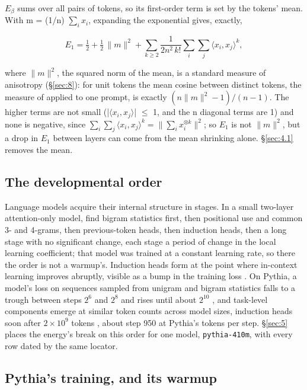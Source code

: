\documentclass[11pt]{article}
\begin{document}
$E_\beta $ sums over all pairs of tokens, so its first-order term is set by the tokens' mean. With m = (1/n) $\sum _{i} x_{i}$, expanding the exponential gives, exactly,

\begin{equation}
E_1 = \tfrac12 + \tfrac12\,\|m\|^2 + \sum_{k\ge 2}\frac{1}{2n^2\,k!}\sum_i\sum_j \langle x_i, x_j\rangle^k,
\end{equation}

where $\|m\|^{2}$, the squared norm of the mean, is a standard measure of anisotropy (\S\ref{sec:8}): for unit tokens the mean cosine between distinct tokens, the measure of \citet{ethayarajh2019} applied to one prompt, is exactly $(n\|m\|^{2}-1)/(n-1)$. The higher terms are not small (|$\langle x_{i}, x_{j}\rangle $| $\leq $ 1, and the n diagonal terms are 1) and none is negative, since $\sum_i\sum_j\langle x_i, x_j\rangle^k = \|\sum_i x_i^{\otimes k}\|^2$; so $E_{1}$ is not $\|m\|^{2}$, but a drop in $E_{1}$ between layers can come from the mean shrinking alone. \S\ref{sec:4.1} removes the mean.

\subsection{The developmental order}\label{sec:2.2}

Language models acquire their internal structure in stages. In a small two-layer attention-only model, \citet{hoogland2024} find bigram statistics first, then positional use and common 3- and 4-grams, then previous-token heads, then induction heads, then a long stage with no significant change, each stage a period of change in the local learning coefficient; that model was trained at a constant learning rate, so there the order is not a warmup's. Induction heads form at the point where in-context learning improves abruptly, visible as a bump in the training loss \citep{olsson2022}. On Pythia, a model's loss on sequences sampled from unigram and bigram statistics falls to a trough between steps $2^{6}$ and $2^{8}$ and rises until about $2^{10}$ \citep{belrose2024}, and task-level components emerge at similar token counts across model sizes, induction heads soon after $2 \times 10^{9}$ tokens \citep{tigges2024}, about step 950 at Pythia's tokens per step. \S\ref{sec:5} places the energy's break on this order for one model, \texttt{pythia-410m}, with every row dated by the same locator.

\subsection{Pythia's training, and its warmup}\label{sec:2.3}
\end{document}
